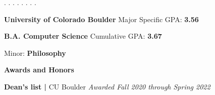 \begin{divider}
  \vspace{-4mm}
  \begin{multicolumn}
      .
      .
      .
      . 
      .
      .
      .
      .
  \end{multicolumn}
\end{divider} 
\begin{divider}[Education]

  {\textbf{University of Colorado Boulder}} \hfill {Major Specific GPA: \textbf{3.56}}

  \vspace{.5mm}

  {\quad \textbf{B.A. Computer Science}} \hfill {Cumulative GPA: \textbf{3.67}}

  {\quad \hspace{3mm} Minor: \textbf{Philosophy}} 

  {\vspace{2mm}}

  {\quad \textbf{Awards and Honors}}

  {\quad \hspace{3mm} \textbf{Dean's list  | }CU Boulder} 
      \hfill \textit{Awarded Fall 2020 through Spring 2022}

\end{divider}


